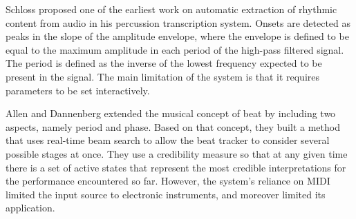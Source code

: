 \documentclass{scrartcl}
\begin{document}



Schloss \cite{Schloss1985} proposed one of the earliest work on automatic extraction of rhythmic content from audio in his percussion transcription system. Onsets are detected as peaks in the slope of the amplitude envelope, where the envelope is defined to be equal to the maximum amplitude in each period of the high-pass filtered signal. The period is defined as the inverse of the lowest frequency expected to be present in the signal. The main limitation of the system is that it requires parameters to be set interactively. 

Allen and Dannenberg \cite{Allen1990} extended the musical concept of beat by including two aspects, namely period and phase. Based on that concept, they built a method that uses real-time beam search to allow the beat tracker to consider several possible stages at once. They use a credibility measure so that at any given time there is a set of active states that represent the most credible interpretations for the performance encountered so far. However, the system's reliance on MIDI limited the input source to electronic instruments, and moreover limited its application.
\end{document}
